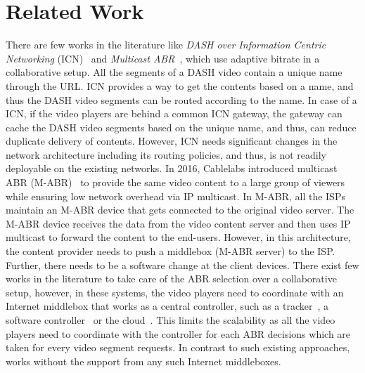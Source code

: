\section{Related Work}
There are few works in the literature like \textit{DASH over Information Centric Networking} (ICN)~\cite{ICN-DASH} and \textit{Multicast ABR}~\cite{multicastAbrCablelabs}, which use adaptive bitrate in a collaborative setup. All the segments of a DASH video contain a unique name through the URL. ICN provides a way to get the contents based on a name, and thus the DASH video segments can be routed according to the name. In case of a ICN, if the video players are behind a common ICN gateway, the gateway can cache the DASH video segments based on the unique name, and thus, can reduce duplicate delivery of contents. However, ICN needs significant changes in the network architecture including its routing policies, and thus, is not readily deployable on the existing networks. In 2016, Cablelabs introduced multicast ABR (M-ABR)~\cite{multicastAbrCablelabs} to provide the same video content to a large group of viewers while ensuring low network overhead via IP multicast. In M-ABR, all the ISPs maintain an M-ABR device that gets connected to the original video server. The M-ABR device receives the data from the video content server and then uses IP multicast to forward the content to the end-users. However, in this architecture, the content provider needs to push a middlebox (M-ABR server) to the ISP. Further, there needs to be a software change at the client devices. There exist few works in the literature to take care of the ABR selection over a collaborative setup, however, in these systems, the video players need to coordinate with an Internet middlebox that works as a central controller, such as a tracker~\cite{detti2016tracker}, a software controller~\cite{khalid2019sdn} or the cloud~\cite{payberah2012clive,wang2014migration}. This limits the scalability as all the video players need to coordinate with the controller for each ABR decisions which are taken for every video segment requests. In contrast to such existing approaches, {\our} works without the support from any such Internet middleboxes. 
